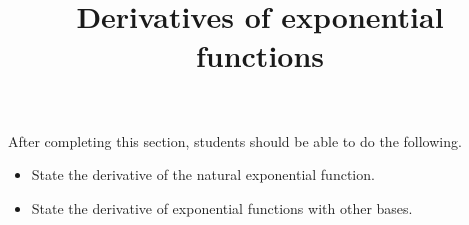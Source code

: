 \documentclass{ximera}
\title{Derivatives of exponential functions}
\begin{document}
\begin{abstract} 
\end{abstract}

\maketitle

\begin{sectionOutcomes}
After completing this section, students should be able to do the following.

\begin{itemize}
	\item State the derivative of the natural exponential function.
	\item State the derivative of exponential functions with other bases.
\end{itemize}
\end{sectionOutcomes}
\end{document}
